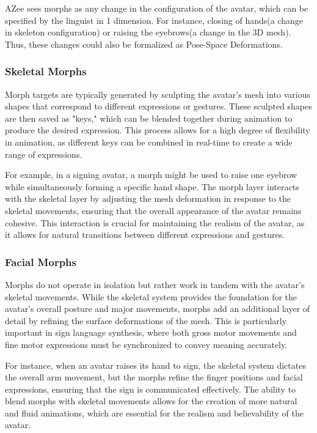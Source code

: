 \documentclass[../../main.tex]{subfiles}
\begin{document}
AZee sees morphs as any change in the configuration of the avatar, which can be specified by the linguist in 1 dimension. For instance, closing of hands(a change in skeleton configuration) or raising the eyebrows(a change in the 3D mesh). Thus, these changes could also be formalized as Pose-Space Deformations.

\subsubsection{Skeletal Morphs}

Morph targets are typically generated by sculpting the avatar's mesh into various shapes that correspond to different expressions or gestures. These sculpted shapes are then saved as "keys," which can be blended together during animation to produce the desired expression. This process allows for a high degree of flexibility in animation, as different keys can be combined in real-time to create a wide range of expressions.

For example, in a signing avatar, a morph might be used to raise one eyebrow while simultaneously forming a specific hand shape. The morph layer interacts with the skeletal layer by adjusting the mesh deformation in response to the skeletal movements, ensuring that the overall appearance of the avatar remains cohesive. This interaction is crucial for maintaining the realism of the avatar, as it allows for natural transitions between different expressions and gestures.

\subsubsection{Facial Morphs}

Morphs do not operate in isolation but rather work in tandem with the avatar's skeletal movements. While the skeletal system provides the foundation for the avatar's overall posture and major movements, morphs add an additional layer of detail by refining the surface deformations of the mesh. This is particularly important in sign language synthesis, where both gross motor movements and fine motor expressions must be synchronized to convey meaning accurately.

For instance, when an avatar raises its hand to sign, the skeletal system dictates the overall arm movement, but the morphs refine the finger positions and facial expressions, ensuring that the sign is communicated effectively. The ability to blend morphs with skeletal movements allows for the creation of more natural and fluid animations, which are essential for the realism and believability of the avatar.
\end{document}
